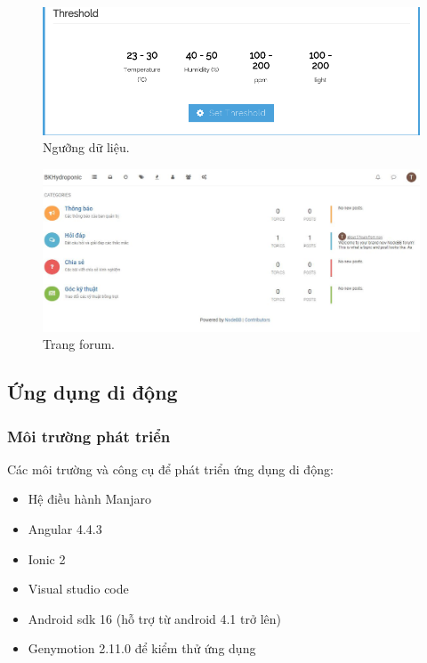 \documentclass[a4paper,12pt,oneside]{article}
\begin{document}
\begin{center}
\begin{figure}[H]
\begin{center}
\includegraphics[scale=.5]{hinh/web_threshold.png}
\end{center}
\caption{Ngưỡng dữ liệu.}
\end{figure}

\begin{figure}[H]
\begin{center}
\includegraphics[scale=.5]{hinh/web_forum.jpg}
\end{center}
\caption{Trang forum.}
\end{figure}



\end{center}

\subsection{Ứng dụng di động}
\subsubsection{Môi trường phát triển}
Các môi trường và công cụ để phát triển ứng dụng di động:
\begin{itemize}
\item Hệ điều hành Manjaro
\item Angular 4.4.3
\item Ionic 2
\item Visual studio code
\item Android sdk 16 (hỗ trợ từ android 4.1 trở lên)
\item Genymotion 2.11.0 để kiểm thử ứng dụng
\end{itemize}
\end{document}
